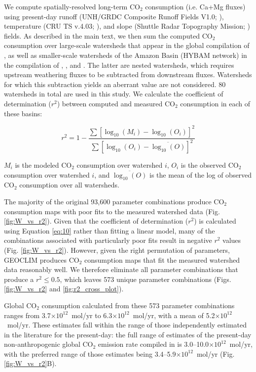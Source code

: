 \documentclass[11pt,letterpaper]{article}
\newcommand{\COtwo}{CO$_{2}$\xspace}
\begin{document}
We compute spatially-resolved long-term \COtwo consumption (i.e. Ca+Mg fluxes) using present-day runoff (UNH/GRDC Composite Runoff Fields V1.0; \citealp{Fekete1999a}), temperature (CRU TS v.4.03; \citealp{Harris2013a}), and slope (Shuttle Radar Topography Mission; \citealp{Farr2007a}) fields. As described in the main text, we then sum the computed \COtwo consumption over large-scale watersheds that appear in the global compilation of \citet{Gaillardet1999a}, as well as smaller-scale watersheds of the Amazon Basin (HYBAM network) in the compilation of \citet{Moquet2011a}, \citet{Moquet2016a}, and \citet{Moquet2018a}. The latter are nested watersheds, which requires upstream weathering fluxes to be subtracted from downstream fluxes. Watersheds for which this subtraction yields an aberrant value are not considered. 80 watersheds in total are used in this study. We calculate the coefficient of determination ($r^{2}$) between computed and measured \COtwo consumption in each of these basins:

\begin{equation*}
    r^{2} = 1 - \frac{\sum\left[ \log_{10}(M_{i}) - \log_{10}(O_{i}) \right]^{2}}{\sum\left[ \log_{10}(O_{i}) - \overline{\log_{10}(O)} \right]^{2}}
    \label{eq:10}
\end{equation*}

\noindent
$M_{i}$ is the modeled \COtwo consumption over watershed $i$, $O_{i}$ is the observed \COtwo consumption over watershed $i$, and $\overline{\log_{10}(O)}$ is the mean of the log of observed \COtwo consumption over all watersheds.

The majority of the original 93,600 parameter combinations produce \COtwo consumption maps with poor fits to the measured watershed data (Fig. \ref{fig:W_vs_r2}). Given that the coefficient of determination ($r^{2}$) is calculated using Equation \ref{eq:10} rather than fitting a linear model, many of the combinations associated with particularly poor fits result in negative $r^{2}$ values (Fig. \ref{fig:W_vs_r2}). However, given the right permutation of parameters, GEOCLIM produces \COtwo consumption maps that fit the measured watershed data reasonably well. We therefore eliminate all parameter combinations that produce a $r^{2}\leq0.5$, which leaves 573 unique parameter combinations (Figs. \ref{fig:W_vs_r2} and \ref{fig:r2_cross_plot}).

Global CO$_{2}$ consumption calculated from these 573 parameter combinations ranges from 3.7$\times10^{12}$~mol/yr to 6.3$\times10^{12}$~mol/yr, with a mean of 5.2$\times10^{12}$~mol/yr. These estimates fall within the range of those independently estimated in the literature for the present-day: the full range of estimates of the present-day non-anthropogenic global CO$_{2}$ emission rate compiled in \citet{Gerlach2011a} is 3.0--10.0$\times10^{12}$~mol/yr, with the preferred range of those estimates being 3.4--5.9$\times10^{12}$~mol/yr (Fig. \ref{fig:W_vs_r2}B).
\end{document}
